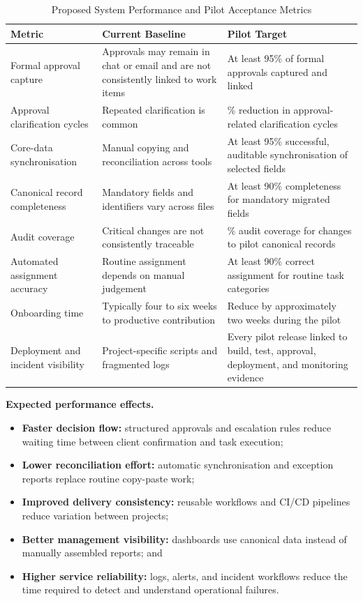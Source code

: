 \documentclass[12pt,a4paper]{report}
\begin{document}
\begin{table}[H]
\centering
\caption{Proposed System Performance and Pilot Acceptance Metrics}
\label{tab:performance-metrics}
\small
\renewcommand{\arraystretch}{1.25}
\begin{tabularx}{\textwidth}{>{\raggedright\arraybackslash}p{3.4cm}
                                >{\raggedright\arraybackslash}X
                                >{\raggedright\arraybackslash}p{4.2cm}}
\toprule
\textbf{Metric} & \textbf{Current Baseline} & \textbf{Pilot Target} \\
\midrule
Formal approval capture & Approvals may remain in chat or email and are not consistently linked to work items & At least 95\% of formal approvals captured and linked \\
Approval clarification cycles & Repeated clarification is common & 50\% reduction in approval-related clarification cycles \\
Core-data synchronisation & Manual copying and reconciliation across tools & At least 95\% successful, auditable synchronisation of selected fields \\
Canonical record completeness & Mandatory fields and identifiers vary across files & At least 90\% completeness for mandatory migrated fields \\
Audit coverage & Critical changes are not consistently traceable & 100\% audit coverage for changes to pilot canonical records \\
Automated assignment accuracy & Routine assignment depends on manual judgement & At least 90\% correct assignment for routine task categories \\
Onboarding time & Typically four to six weeks to productive contribution & Reduce by approximately two weeks during the pilot \\
Deployment and incident visibility & Project-specific scripts and fragmented logs & Every pilot release linked to build, test, approval, deployment, and monitoring evidence \\
\bottomrule
\end{tabularx}
\end{table}

\textbf{Expected performance effects.}
\begin{itemize}[leftmargin=1.6em]
    \item \textbf{Faster decision flow:} structured approvals and escalation rules reduce waiting
          time between client confirmation and task execution;
    \item \textbf{Lower reconciliation effort:} automatic synchronisation and exception reports
          replace routine copy-paste work;
    \item \textbf{Improved delivery consistency:} reusable workflows and CI/CD pipelines reduce
          variation between projects;
    \item \textbf{Better management visibility:} dashboards use canonical data instead of manually
          assembled reports; and
    \item \textbf{Higher service reliability:} logs, alerts, and incident workflows reduce the time
          required to detect and understand operational failures.
\end{itemize}
\end{document}
